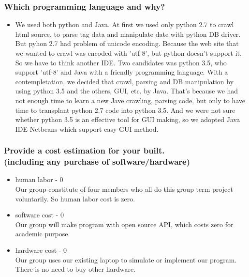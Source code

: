 \documentclass[conference,compsoc, twocolumn]{IEEEtran}
\begin{document}
\subsubsection{Which programming language and why?}
\begin{itemize}
\item  We used both python and Java. At first we used only python 2.7 to crawl html source, to parse tag data and manipulate date with python DB driver. But pyhon 2.7 had problem of unicode encoding. 
Because the web site that we wanted to crawl was encoded with 'utf-8', but python doesn't support it.
So we have to think another IDE. Two candidates was python 3.5, who support 'utf-8' and Java with a friendly programming language. With a contempletation, we decided that crawl, parsing and DB manipulation by using python 3.5 and the others, GUI, etc. by Java. That's because we had not enough time to learn a new Jave crawling, parsing code, but only to have time to transplant python 2.7 code into python 3.5. And we were not sure whether python 3.5 is an effective tool for GUI making, so we adopted Java IDE Netbeans which support easy GUI method.
\end{itemize}

\subsubsection{Provide a cost estimation for your built.\\
 (including any purchase of software/hardware)}
\begin{itemize}
\item human labor - 0 \\
Our group constitute of four members who all do this group term project voluntarily. So human labor cost is zero.
\item software cost - 0  \\
Our group will make program with open source API,  which costs zero for academic purpose.
\item hardware cost - 0  \\
Our group uses our existing laptop to simulate or implement our program. There is no need to buy other hardware. 
\end{itemize}
\end{document}
